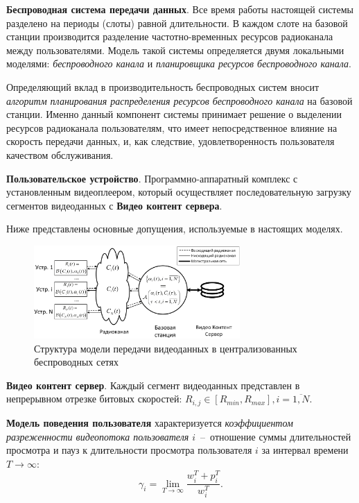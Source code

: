 \textbf{Беспроводная система передачи данных}. Все время работы настоящей системы разделено на периоды (слоты) равной длительности. В каждом слоте на базовой станции производится разделение частотно-временных ресурсов радиоканала между пользователями. Модель такой системы определяется двумя локальными моделями: \textit{беспроводного канала} и \textit{планировщика ресурсов беспроводного канала}.

Определяющий вклад в производительность беспроводных систем вносит \textit{алгоритм планирования распределения ресурсов беспроводного канала} на базовой станции. Именно данный компонент системы принимает решение о выделении ресурсов радиоканала пользователям, что имеет непосредственное влияние на скорость передачи данных, и, как следствие, удовлетворенность пользователя качеством обслуживания.

\textbf{Пользовательское устройство}. Программно-аппаратный комплекс с установленным видеоплеером, который осуществляет последовательную загрузку сегментов видеоданных с \textbf{Видео контент сервера}.

Ниже представлены основные допущения, используемые в настоящих моделях.

\begin{figure}[htbp]
\begin{center}
\includegraphics[width=0.7\textwidth]{../Dissertation/images/Chapter2/SystemModelEch.pdf}
\caption{Структура модели передачи видеоданных в централизованных беспроводных сетях}
\label{fig:SystemModel}
\end{center}
\end{figure}

\textbf{Видео контент сервер}. Каждый сегмент видеоданных представлен в непрерывном отрезке битовых скоростей: $R_{i,j} \in [R_{min}, R_{max}], i=\overline{1,N}$.

\textbf{Модель поведения пользователя} характеризуется \textit{коэффициентом разреженности видеопотока пользователя $i$}~--~отношение суммы длительностей просмотра и пауз к длительности просмотра пользователя $i$ за интервал времени $T\rightarrow\infty$:
$$\gamma_i = \lim\limits_{T\rightarrow\infty} \frac{w_i^T + p_i^T}{w_i^T}.$$

